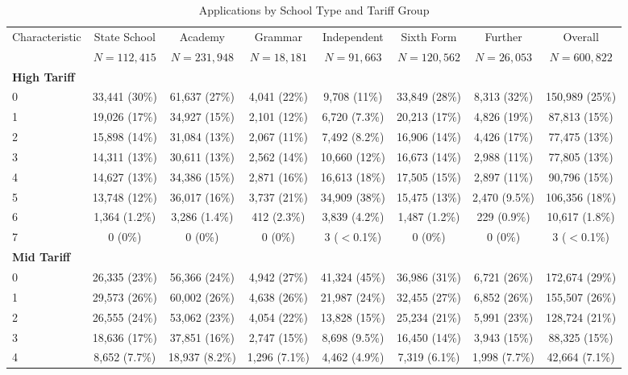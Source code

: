 \begin{table}[htbp]\centering
\caption{Applications by School Type and Tariff Group}
\scriptsize
\begin{tabular}{lccccccc}
\hline
Characteristic & State School & Academy & Grammar & Independent & Sixth Form & Further & Overall \\
 & $N=112{,}415$ & $N=231{,}948$ & $N=18{,}181$ & $N=91{,}663$ & $N=120{,}562$ & $N=26{,}053$ & $N=600{,}822$ \\
\hline
\multicolumn{8}{l}{\textbf{High Tariff}} \\
0 & 33,441 (30\%) & 61,637 (27\%) & 4,041 (22\%) & 9,708 (11\%) & 33,849 (28\%) & 8,313 (32\%) & 150,989 (25\%) \\
1 & 19,026 (17\%) & 34,927 (15\%) & 2,101 (12\%) & 6,720 (7.3\%) & 20,213 (17\%) & 4,826 (19\%) & 87,813 (15\%) \\
2 & 15,898 (14\%) & 31,084 (13\%) & 2,067 (11\%) & 7,492 (8.2\%) & 16,906 (14\%) & 4,426 (17\%) & 77,475 (13\%) \\
3 & 14,311 (13\%) & 30,611 (13\%) & 2,562 (14\%) & 10,660 (12\%) & 16,673 (14\%) & 2,988 (11\%) & 77,805 (13\%) \\
4 & 14,627 (13\%) & 34,386 (15\%) & 2,871 (16\%) & 16,613 (18\%) & 17,505 (15\%) & 2,897 (11\%) & 90,796 (15\%) \\
5 & 13,748 (12\%) & 36,017 (16\%) & 3,737 (21\%) & 34,909 (38\%) & 15,475 (13\%) & 2,470 (9.5\%) & 106,356 (18\%) \\
6 & 1,364 (1.2\%) & 3,286 (1.4\%) & 412 (2.3\%) & 3,839 (4.2\%) & 1,487 (1.2\%) & 229 (0.9\%) & 10,617 (1.8\%) \\
7 & 0 (0\%) & 0 (0\%) & 0 (0\%) & 3 ($<$0.1\%) & 0 (0\%) & 0 (0\%) & 3 ($<$0.1\%) \\
\hline
\multicolumn{8}{l}{\textbf{Mid Tariff}} \\
0 & 26,335 (23\%) & 56,366 (24\%) & 4,942 (27\%) & 41,324 (45\%) & 36,986 (31\%) & 6,721 (26\%) & 172,674 (29\%) \\
1 & 29,573 (26\%) & 60,002 (26\%) & 4,638 (26\%) & 21,987 (24\%) & 32,455 (27\%) & 6,852 (26\%) & 155,507 (26\%) \\
2 & 26,555 (24\%) & 53,062 (23\%) & 4,054 (22\%) & 13,828 (15\%) & 25,234 (21\%) & 5,991 (23\%) & 128,724 (21\%) \\
3 & 18,636 (17\%) & 37,851 (16\%) & 2,747 (15\%) & 8,698 (9.5\%) & 16,450 (14\%) & 3,943 (15\%) & 88,325 (15\%) \\
4 & 8,652 (7.7\%) & 18,937 (8.2\%) & 1,296 (7.1\%) & 4,462 (4.9\%) & 7,319 (6.1\%) & 1,998 (7.7\%) & 42,664 (7.1\%) \\

\end{tabular}
\end{table}
